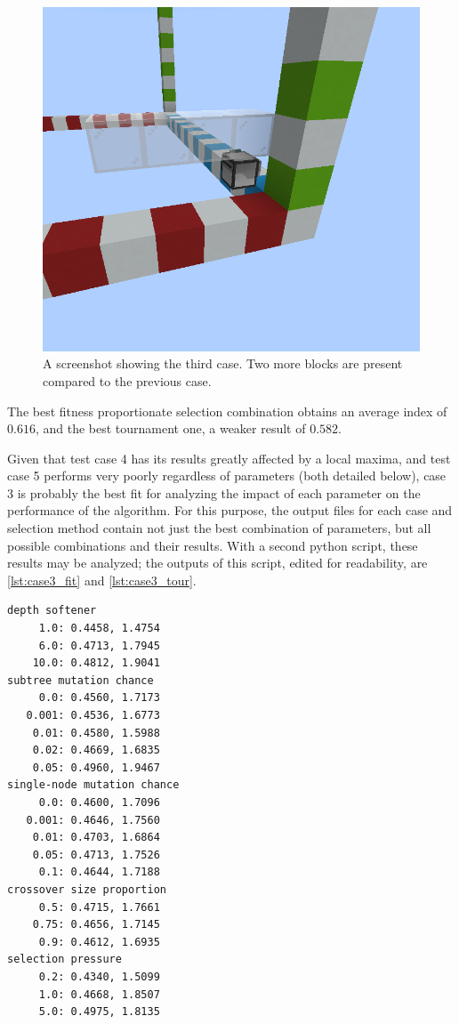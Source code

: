 \documentclass{report}
\newenvironment{code}{\captionsetup{type=listing}}{}
\begin{document}
\begin{figure}[H]
    \centering
    \includegraphics[scale=0.3]{minecraft4}
    \caption{A screenshot showing the third case. Two more blocks are present compared to the previous case.}
\end{figure}

The best fitness proportionate selection combination obtains an average index of $0.616$, and the best tournament one, a weaker result of $0.582$.

Given that test case 4 has its results greatly affected by a local maxima, and test case 5 performs very poorly regardless of parameters (both detailed below), case 3 is probably the best fit for analyzing the impact of each parameter on the performance of the algorithm. For this purpose, the output files for each case and selection method contain not just the best combination of parameters, but all possible combinations and their results. With a second python script, these results may be analyzed; the outputs of this script, edited for readability, are \autoref{lst:case3_fit} and \autoref{lst:case3_tour}.

\begin{code}
    \begin{verbatim}
depth softener
     1.0: 0.4458, 1.4754
     6.0: 0.4713, 1.7945
    10.0: 0.4812, 1.9041
subtree mutation chance
     0.0: 0.4560, 1.7173
   0.001: 0.4536, 1.6773
    0.01: 0.4580, 1.5988
    0.02: 0.4669, 1.6835
    0.05: 0.4960, 1.9467
single-node mutation chance
     0.0: 0.4600, 1.7096
   0.001: 0.4646, 1.7560
    0.01: 0.4703, 1.6864
    0.05: 0.4713, 1.7526
     0.1: 0.4644, 1.7188
crossover size proportion
     0.5: 0.4715, 1.7661
    0.75: 0.4656, 1.7145
     0.9: 0.4612, 1.6935
selection pressure
     0.2: 0.4340, 1.5099
     1.0: 0.4668, 1.8507
     5.0: 0.4975, 1.8135
    \end{verbatim}
    \caption{Average Dice index and depth for each parameter of the fitness proportionate selection runs.}
    \label{lst:case3_fit}
\end{code}
\end{document}
